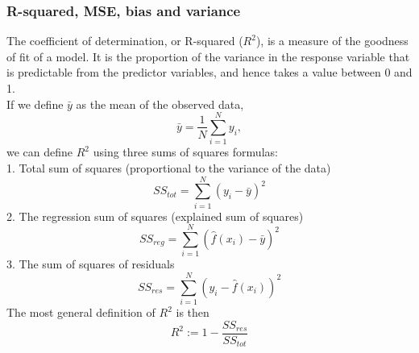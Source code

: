 \documentclass[12pt]{article}
\begin{document}
\subsubsection{R-squared, MSE, bias and variance}
The coefficient of determination, or R-squared ($R^2$), is a measure of the goodness of fit of a model. It is the proportion of the variance in the response variable that is predictable from the predictor variables, and hence takes a value between 0 and 1.\\
If we define $\bar{y}$ as the mean of the observed data,
\begin{equation}
\bar{y} = \frac{1}{N}\sum_{i=1}^{N}y_i,
\end{equation}
we can define $R^2$ using three sums of squares formulas:\\
1. Total sum of squares (proportional to the variance of the data)
\begin{equation}
SS_{tot} = \sum_{i=1}^{N}(y_i-\bar{y})^2
\end{equation}
2. The regression sum of squares (explained sum of squares)
\begin{equation}
SS_{reg} = \sum_{i=1}^{N}(\hat{f}(x_i)-\bar{y})^2
\end{equation}
3. The sum of squares of residuals
\begin{equation}
SS_{res} = \sum_{i=1}^{N}(y_i - \hat{f}(x_i))^2
\end{equation}
The most general definition of $R^2$ is then\\
\begin{equation}
R^2 := 1 - \frac{SS_{res}}{SS_{tot}}
\end{equation}
\\ \\
\end{document}
